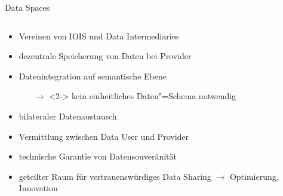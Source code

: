 \begin{frame}{Data Spaces \footnotesize\cite{mollerIndustrialDataEcosystems2024}}
    \begin{columns}
        \begin{column}{0.6\textwidth}
            \begin{itemize}
                \item Vereinen von IOIS und Data Intermediaries
                \item dezentrale Speicherung von Daten bei Provider
                
                \item<2-> Datenintegration auf semantische Ebene
                \begin{itemize}
                    \item[$\to$]<2-> kein einheitliches Daten"=Schema notwendig
                \end{itemize}
                
                \item<3-> bilateraler Datenaustausch %
                \item<3-> Vermittlung zwischen Data User und Provider %

                
                \item<4-> technische Garantie von Datensouveränität
                \item<4-> geteilter Raum für vertrauenswürdiges Data Sharing $\to$ Optimierung, Innovation
            \end{itemize}
        \end{column}
        

\end{columns}
\end{frame}
